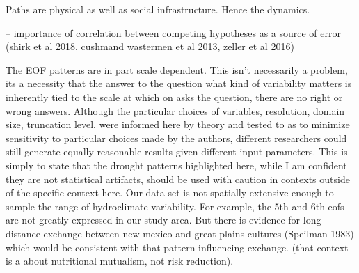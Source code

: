 \documentclass[10pt]{iopart}
\begin{document}
Paths are physical as well as social infrastructure. Hence the dynamics.

-- importance of correlation between competing hypotheses as a source of error (shirk et al 2018, cushmand wastermen et al 2013, zeller et al 2016)


The EOF patterns are in part scale dependent. This isn't necessarily a problem, its a necessity that the answer to the question what kind of variability matters is inherently tied to the scale at which on asks the question, there are no right or wrong answers. Although the particular choices of variables, resolution, domain size, truncation level, were informed here by theory and tested to as to minimize sensitivity to particular choices made by the authors, different researchers could still generate equally reasonable results given  different input parameters.  This is simply to state that the drought patterns highlighted here, while I am confident they are not statistical artifacts, should be used with caution in contexts outside of the specific context here. Our data set is not spatially extensive enough to sample the range of hydroclimate variability. For example, the 5th and 6th eofs are not greatly expressed in our study area. But there is evidence for long distance exchange between new mexico and great plains cultures (Speilman 1983) which would be consistent with that pattern influencing exchange. (that context is a about nutritional mutualism, not risk reduction).


\end{document}
